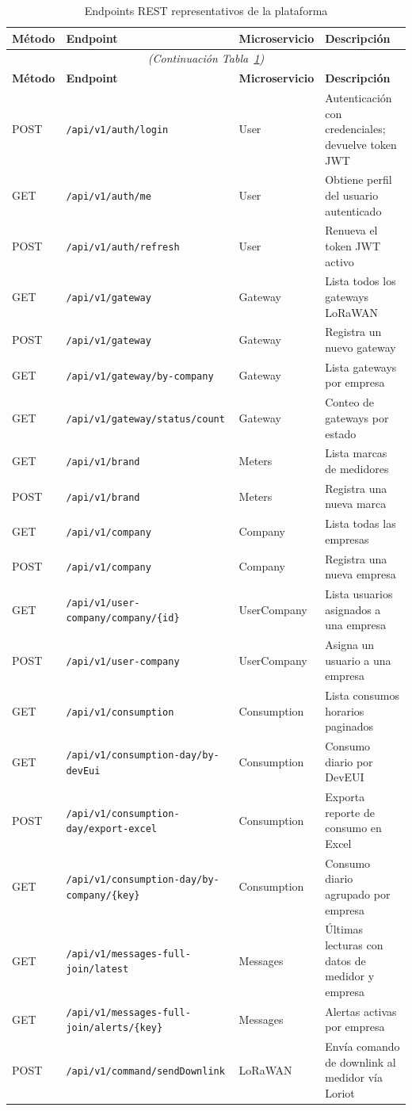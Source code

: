 \documentclass[12pt,a4paper,oneside]{report}
\begin{document}
\begin{longtable}{lllp{5.0cm}}
\caption{Endpoints REST representativos de la plataforma}\label{tab:endpoints} \\
\toprule
\textbf{Método} & \textbf{Endpoint} & \textbf{Microservicio} & \textbf{Descripción} \\
\midrule
\endfirsthead
\multicolumn{4}{c}{\textit{(Continuación Tabla~\ref{tab:endpoints})}} \\
\toprule
\textbf{Método} & \textbf{Endpoint} & \textbf{Microservicio} & \textbf{Descripción} \\
\midrule
\endhead
\bottomrule
\endlastfoot
POST & \texttt{/api/v1/auth/login} & User & Autenticación con credenciales; devuelve token JWT \\
GET  & \texttt{/api/v1/auth/me} & User & Obtiene perfil del usuario autenticado \\
POST & \texttt{/api/v1/auth/refresh} & User & Renueva el token JWT activo \\
GET  & \texttt{/api/v1/gateway} & Gateway & Lista todos los gateways LoRaWAN \\
POST & \texttt{/api/v1/gateway} & Gateway & Registra un nuevo gateway \\
GET  & \texttt{/api/v1/gateway/by-company} & Gateway & Lista gateways por empresa \\
GET  & \texttt{/api/v1/gateway/status/count} & Gateway & Conteo de gateways por estado \\
GET  & \texttt{/api/v1/brand} & Meters & Lista marcas de medidores \\
POST & \texttt{/api/v1/brand} & Meters & Registra una nueva marca \\
GET  & \texttt{/api/v1/company} & Company & Lista todas las empresas \\
POST & \texttt{/api/v1/company} & Company & Registra una nueva empresa \\
GET  & \texttt{/api/v1/user-company/company/\{id\}} & UserCompany & Lista usuarios asignados a una empresa \\
POST & \texttt{/api/v1/user-company} & UserCompany & Asigna un usuario a una empresa \\
GET  & \texttt{/api/v1/consumption} & Consumption & Lista consumos horarios paginados \\
GET  & \texttt{/api/v1/consumption-day/by-devEui} & Consumption & Consumo diario por DevEUI \\
POST & \texttt{/api/v1/consumption-day/export-excel} & Consumption & Exporta reporte de consumo en Excel \\
GET  & \texttt{/api/v1/consumption-day/by-company/\{key\}} & Consumption & Consumo diario agrupado por empresa \\
GET  & \texttt{/api/v1/messages-full-join/latest} & Messages & Últimas lecturas con datos de medidor y empresa \\
GET  & \texttt{/api/v1/messages-full-join/alerts/\{key\}} & Messages & Alertas activas por empresa \\
POST & \texttt{/api/v1/command/sendDownlink} & LoRaWAN & Envía comando de downlink al medidor vía Loriot \\
\end{longtable}
\end{document}
